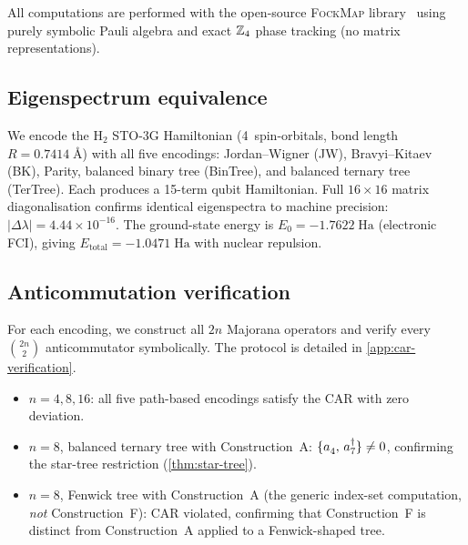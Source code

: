 %

All computations are performed with the open-source \textsc{FockMap}
library~\cite{fockmap2026} using purely symbolic Pauli
algebra and exact $\mathbb{Z}_4$ phase tracking (no matrix representations).

\subsection{Eigenspectrum equivalence}
\label{sec:val-eigen}

We encode the H$_2$ STO-3G Hamiltonian (4~spin-orbitals, bond
length $R = 0.7414\;\text{\AA}$) with all five encodings:
Jordan--Wigner (JW), Bravyi--Kitaev (BK), Parity, balanced binary
tree (BinTree), and balanced ternary tree (TerTree).  Each produces a
15-term qubit Hamiltonian.  Full $16 \times 16$ matrix diagonalisation
confirms identical eigenspectra to machine precision:
$|\Delta\lambda| = 4.44 \times 10^{-16}$.  The ground-state
energy is $E_0 = -1.7622\;\text{Ha}$ (electronic FCI), giving
$E_\text{total} = -1.0471\;\text{Ha}$ with nuclear repulsion.

\subsection{Anticommutation verification}
\label{sec:val-car}

For each encoding, we construct all $2n$ Majorana operators and verify
every $\binom{2n}{2}$ anticommutator symbolically.  The protocol is
detailed in \cref{app:car-verification}.

\begin{itemize}
  \item $n = 4, 8, 16$: all five path-based encodings satisfy the CAR
    with zero deviation.
  \item $n = 8$, balanced ternary tree with Construction~A:
    $\acomm{\an{4}}{\ad{7}} \neq 0$, confirming the star-tree
    restriction (\cref{thm:star-tree}).
  \item $n = 8$, Fenwick tree with Construction~A (the generic
    index-set computation, \emph{not} Construction~F): CAR violated,
    confirming that Construction~F is distinct from Construction~A
    applied to a Fenwick-shaped tree.
\end{itemize}

